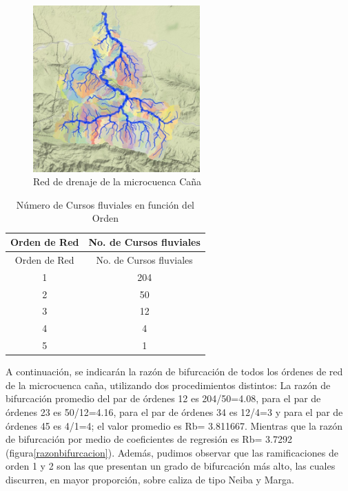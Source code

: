 \documentclass[11pt,]{article}
\begin{document}
\begin{figure}
\centering
\includegraphics[width=0.57000\textwidth]{mapa_orden_de_red.jpeg}
\caption{Red de drenaje de la microcuenca Caña\label{reddrenaje}}
\end{figure}

\begin{longtable}[]{@{}cc@{}}
\caption{\label{tab:cursosfluviales} Número de Cursos fluviales en
función del Orden}\tabularnewline
\toprule
Orden de Red & No. de Cursos fluviales\tabularnewline
\midrule
\endfirsthead
\toprule
Orden de Red & No. de Cursos fluviales\tabularnewline
\midrule
\endhead
1 & 204\tabularnewline
2 & 50\tabularnewline
3 & 12\tabularnewline
4 & 4\tabularnewline
5 & 1\tabularnewline
\bottomrule
\end{longtable}

A continuación, se indicarán la razón de bifurcación de todos los
órdenes de red de la microcuenca caña, utilizando dos procedimientos
distintos: La razón de bifurcación promedio del par de órdenes
1\textbar{}2 es 204/50=4.08, para el par de órdenes 2\textbar{}3 es
50/12=4.16, para el par de órdenes 3\textbar{}4 es 12/4=3 y para el par
de órdenes 4\textbar{}5 es 4/1=4; el valor promedio es Rb= 3.811667.
Mientras que la razón de bifurcación por medio de coeficientes de
regresión es Rb= 3.7292 (figura\ref{razonbifurcacion}). Además, pudimos
observar que las ramificaciones de orden 1 y 2 son las que presentan un
grado de bifurcación más alto, las cuales discurren, en mayor
proporción, sobre caliza de tipo Neiba y Marga.
\end{document}

